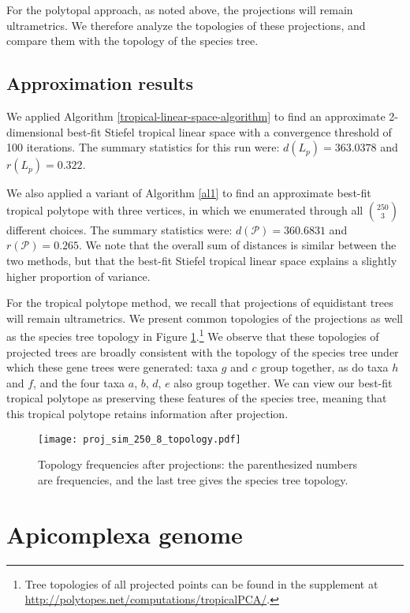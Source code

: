 \documentclass[12pt]{extarticle}
\numberwithin{theorem}{section}
\begin{document}
For the polytopal approach, as noted above, the projections will remain ultrametrics. We therefore analyze the topologies of these projections, and compare them with the topology of the species tree.

\subsection{Approximation results}

We applied Algorithm \ref{tropical-linear-space-algorithm} to find an approximate 2-dimensional best-fit Stiefel tropical linear space with a convergence threshold of 100 iterations. The summary statistics for this run were: $d(L_p)=363.0378$ and $r(L_p) = 0.322$.

We also applied a variant of Algorithm \ref{al1} to find an approximate best-fit tropical polytope with three vertices, in which we enumerated through all $\binom{250}{3}$ different choices. The summary statistics were: $d(\mathcal P) = 360.6831$ and 
$r(\mathcal P) = 0.265$. We note that the overall sum of distances is similar between the two methods, but that the best-fit Stiefel tropical linear space explains a slightly higher proportion of variance. 

For the tropical polytope method, we recall that projections of equidistant trees will remain ultrametrics. We present common topologies of the projections as well as the species tree topology
in Figure \ref{sim_topology}.\footnote{Tree topologies of all projected
points can be found in the supplement 
at \url{http://polytopes.net/computations/tropicalPCA/}.}
We observe that these topologies of
projected trees are broadly consistent with the topology of the species tree
under which these gene trees were generated: taxa $g$ and $c$ group
together, as do taxa $h$ and $f$, and the four taxa $a$, $b$, $d$, $e$ also group together. We can view our best-fit tropical polytope as preserving these features of the species tree, meaning that this tropical polytope retains information after projection.
\begin{figure}[!ht]
\centering
\texttt{[image: proj\_sim\_250\_8\_topology.pdf]}
  \caption{Topology frequencies after projections: the parenthesized numbers are frequencies, and the last tree gives the species tree topology.}
  \label{sim_topology}
\end{figure}

\section{Apicomplexa genome}\label{apicomplexa}
\end{document}
